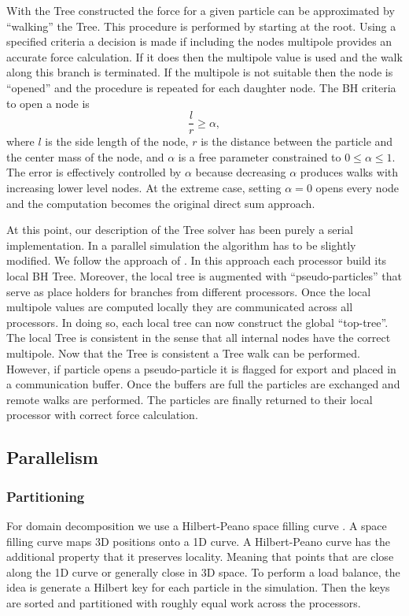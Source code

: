 With the Tree constructed the force for a given particle can be approximated by ``walking'' the
Tree. This procedure is performed by starting at the root. Using a specified criteria a decision
is made if including the nodes multipole provides an accurate force calculation. If it does
then the multipole value is used and the walk along this branch is terminated. If the multipole 
is not suitable then the node is ``opened'' and the procedure is repeated for each daughter node.
The BH criteria to open a node is
\begin{equation}
\frac{l}{r} \ge \alpha,
\end{equation}
where $l$ is the side length of the node, $r$ is the distance between the particle and the center mass
of the node, and $\alpha$ is a free parameter constrained to $0 \le \alpha \le 1$. The error is 
effectively controlled by $\alpha$ because decreasing $\alpha$ produces walks with increasing lower
level nodes. At the extreme case, setting $\alpha=0$ opens every node and the computation becomes
the original direct sum approach.

At this point, our description of the Tree solver has been purely a serial implementation. In a parallel
simulation the algorithm has to be slightly modified. We follow the approach of \cite{Springel2005}. In
this approach each processor build its local BH Tree. Moreover, the local tree is augmented with
``pseudo-particles'' that serve as place holders for branches from different processors. Once the local
multipole values are computed locally they are communicated across all processors. In doing so, each
local tree can now construct the global ``top-tree''. The local Tree is consistent in the sense that all
internal nodes have the correct multipole. Now that the Tree is consistent a Tree walk can be performed.
However, if particle opens a pseudo-particle it is flagged for export and placed in a communication
buffer. Once the buffers are full the particles are exchanged and remote walks are performed. The
particles are finally returned to their local processor with correct force calculation.

\subsection{Parallelism}
\label{sec.parallel}
\subsubsection{Partitioning}
For domain decomposition we use a Hilbert-Peano space filling curve \citep{Springel2005}. A space
filling curve maps 3D positions onto a 1D curve. A Hilbert-Peano curve has the additional property
that it preserves locality. Meaning that points that are close along the 1D curve or generally close
in 3D space. To perform a load balance, the idea is generate a Hilbert key for each particle in
the simulation. Then the keys are sorted and partitioned with roughly equal work across the processors.


